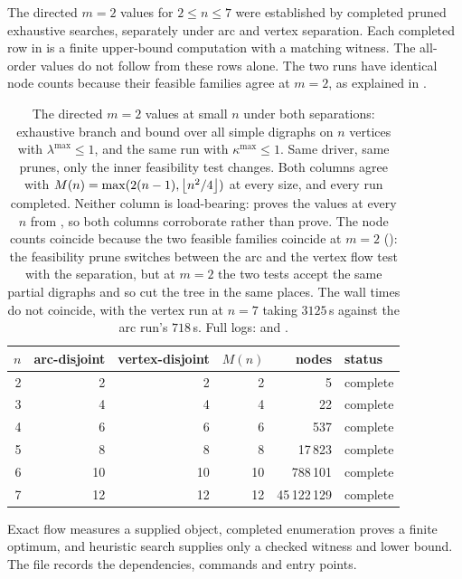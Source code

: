 The directed $m=2$ values for $2\le n\le7$ were established by completed pruned exhaustive searches, separately under arc and vertex separation. Each completed row in  is a finite upper-bound computation with a matching witness. The all-order values do not follow from these rows alone. The two runs have identical node counts because their feasible families agree at $m=2$, as explained in .

\begin{table}[ht]
  \centering
  \small
  \begin{tabular}{@{}rrrrrl@{}}
    \toprule
    $n$ & arc-disjoint & vertex-disjoint & $M(n)$ & nodes & status \\
    \midrule
    2 & 2 & 2 & 2 & 5 & complete \\
    3 & 4 & 4 & 4 & 22 & complete \\
    4 & 6 & 6 & 6 & 537 & complete \\
    5 & 8 & 8 & 8 & 17\,823 & complete \\
    6 & 10 & 10 & 10 & 788\,101 & complete \\
    7 & 12 & 12 & 12 & 45\,122\,129 & complete \\
    \bottomrule
  \end{tabular}
  \caption{The directed $m = 2$ values at small $n$ under both separations:
  exhaustive branch and bound over all simple digraphs on $n$ vertices with
  $\lambda^{\max} \le 1$, and the same run with $\kappa^{\max} \le 1$. Same
  driver, same prunes, only the inner feasibility test changes. Both columns
  agree with $M(n) = \max(2(n-1), \left\lfloor n^2/4 \right\rfloor)$ at every size, and every run
  completed. Neither column is load-bearing:  proves the values at
  every $n$ from , so both columns corroborate rather
  than prove. The node counts coincide because the two feasible
  families coincide at $m=2$ (): the feasibility
  prune switches between the arc and the vertex flow test with the separation,
  but at $m=2$ the two tests accept the same partial digraphs and so cut the
  tree in the same places. The wall times do not coincide, with the vertex run at $n = 7$ taking
  $3125$\,s against the arc run's $718$\,s. Full logs:
   and
  .}
  \label{tab:basecase-search}
\end{table}

Exact
flow measures a supplied object, completed enumeration proves a finite optimum,
and heuristic search supplies only a checked witness and lower bound. The file
 records the dependencies, commands and entry points.
